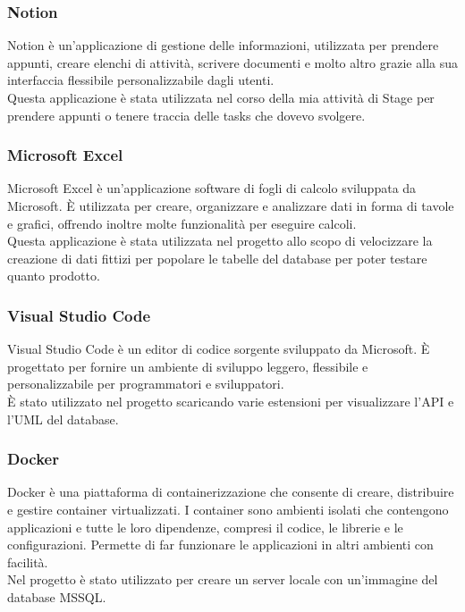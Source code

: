 \subsubsection*{Notion}
Notion è un'applicazione di gestione delle informazioni, utilizzata per prendere appunti, creare elenchi di attività, scrivere documenti e molto altro grazie alla sua interfaccia flessibile personalizzabile dagli utenti.\\
Questa applicazione è stata utilizzata nel corso della mia attività di Stage per prendere appunti o tenere traccia delle tasks che dovevo svolgere.\\ 


\subsubsection*{Microsoft Excel}
Microsoft Excel è un'applicazione software di fogli di calcolo sviluppata da Microsoft. È utilizzata per creare, organizzare e analizzare dati in forma di tavole e grafici, offrendo inoltre molte funzionalità per eseguire calcoli.\\
Questa applicazione è stata utilizzata nel progetto allo scopo di velocizzare la creazione di dati fittizi per popolare le tabelle del database per poter testare quanto prodotto.\\


\subsubsection*{Visual Studio Code}
Visual Studio Code è un editor di codice sorgente sviluppato da Microsoft. È progettato per fornire un ambiente di sviluppo leggero, flessibile e personalizzabile per programmatori e sviluppatori.\\
È stato utilizzato nel progetto scaricando varie estensioni per visualizzare l'API e l'UML del database.\\

\subsubsection*{Docker}
Docker è una piattaforma di containerizzazione che consente di creare, distribuire e gestire container virtualizzati. I container sono ambienti isolati che contengono applicazioni e tutte le loro dipendenze, compresi il codice, le librerie e le configurazioni. Permette di far funzionare le applicazioni in altri ambienti con facilità.\\
Nel progetto è stato utilizzato per creare un server locale con un'immagine del database MSSQL.\\

